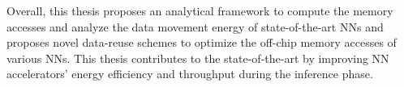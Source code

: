 Overall, this thesis proposes an analytical framework to compute the memory accesses and analyze the data movement energy of state-of-the-art NNs and proposes novel data-reuse schemes to optimize the off-chip memory accesses of various NNs. This thesis contributes to the state-of-the-art by improving NN accelerators' energy efficiency and throughput during the inference phase.